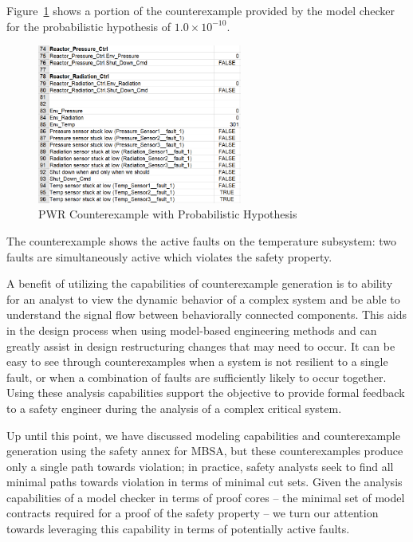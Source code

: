 Figure~\ref{fig:probPWRVerifCoex} shows a portion of the counterexample provided by the model checker for the probabilistic hypothesis of $1.0 \times 10^{-10}$. 

\begin{figure}[h!]
		\includegraphics[width=0.6\textwidth]{images/probPWRVerifCoex.png}
	\caption{PWR Counterexample with Probabilistic Hypothesis}
	\label{fig:probPWRVerifCoex}
\end{figure}

The counterexample shows the active faults on the temperature subsystem: two faults are simultaneously active which violates the safety property. 

A benefit of utilizing the capabilities of counterexample generation is to ability for an analyst to view the dynamic behavior of a complex system and be able to understand the signal flow between behaviorally connected components. This aids in the design process when using model-based engineering methods and can greatly assist in design restructuring changes that may need to occur. It can be easy to see through counterexamples when a system is not resilient to a single fault, or when a combination of faults are sufficiently likely to occur together. Using these analysis capabilities support the objective to provide formal feedback to a safety engineer during the analysis of a complex critical system.

Up until this point, we have discussed modeling capabilities and counterexample generation using the safety annex for MBSA, but these counterexamples produce only a single path towards violation; in practice, safety analysts seek to find all minimal paths towards violation in terms of minimal cut sets. Given the analysis capabilities of a model checker in terms of proof cores -- the minimal set of model contracts required for a proof of the safety property -- we turn our attention towards leveraging this capability in terms of potentially active faults. 